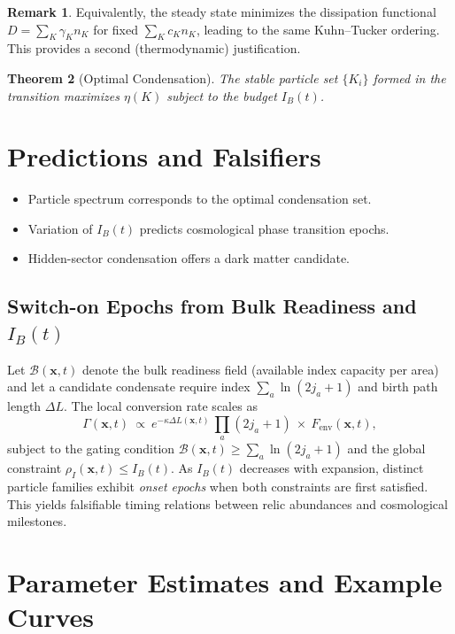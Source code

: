 \documentclass[11pt]{article}
\theoremstyle{plain}
\newtheorem{theorem}{Theorem}[section]
\theoremstyle{definition}
\newtheorem{remark}[theorem]{Remark}
\begin{document}
\begin{remark}
  Equivalently, the steady state minimizes the dissipation functional
  $D=\sum_K \gamma_K n_K$ for fixed $\sum_K c_K n_K$, leading to the same Kuhn–Tucker ordering. This provides a second (thermodynamic) justification.
\end{remark}

\begin{theorem}[Optimal Condensation]
  The stable particle set $\{K_i\}$ formed in the transition maximizes $\eta(K)$ subject to the budget $I_B(t)$.
\end{theorem}

\section{Predictions and Falsifiers}
\begin{itemize}
  \item Particle spectrum corresponds to the optimal condensation set.
  \item Variation of $I_B(t)$ predicts cosmological phase transition epochs.
  \item Hidden-sector condensation offers a dark matter candidate.
\end{itemize}

\subsection*{Switch-on Epochs from Bulk Readiness and $I_B(t)$}\label{subsec:switch-on}
Let $\mathcal{B}(\mathbf{x},t)$ denote the bulk readiness field (available index capacity per area) and let a candidate condensate require index $\sum_a\ln(2j_a+1)$ and birth path length $\Delta L$. The local conversion rate scales as
\begin{equation}
  \Gamma(\mathbf{x},t)\ \propto\ e^{-\kappa \Delta L(\mathbf{x},t)}\,\prod_a(2j_a+1)\ \times\ F_{\mathrm{env}}(\mathbf{x},t),
\end{equation}
subject to the gating condition $\mathcal{B}(\mathbf{x},t)\ge \sum_a\ln(2j_a+1)$ and the global constraint $\rho_I(\mathbf{x},t)\le I_B(t)$. As $I_B(t)$ decreases with expansion, distinct particle families exhibit \emph{onset epochs} when both constraints are first satisfied. This yields falsifiable timing relations between relic abundances and cosmological milestones.

\appendix
\section{Parameter Estimates and Example Curves}\label{app:param-examples}
\end{document}
